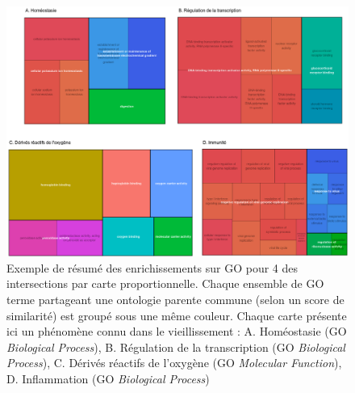 
\begin{figure}[ht]
    \centering
    \includegraphics[width=1\textwidth]{img/chap2/chap2_revigo_resume_4_enrich.png}
    \caption{Exemple de résumé des enrichissements sur GO pour 4 des intersections par carte proportionnelle. Chaque ensemble de GO terme partageant une ontologie parente commune (selon un score de similarité) est groupé sous une même couleur. Chaque carte présente ici un phénomène connu dans le vieillissement : A. Homéostasie (GO \textit{Biological Process}), B. Régulation de la transcription (GO \textit{Biological Process}), C. Dérivés réactifs de l'oxygène (GO \textit{Molecular Function}), D. Inflammation (GO \textit{Biological Process}) }
    \label{figure:revigo_resume_4_enrich}
\end{figure}

